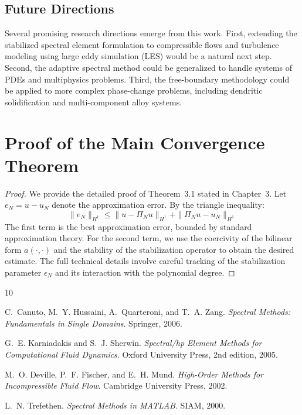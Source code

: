 \documentclass[12pt,a4paper,oneside]{report}
\begin{document}
\section{Future Directions}

Several promising research directions emerge from this work. First, extending the stabilized spectral element formulation to compressible flows and turbulence modeling using large eddy simulation (LES) would be a natural next step. Second, the adaptive spectral method could be generalized to handle systems of PDEs and multiphysics problems. Third, the free-boundary methodology could be applied to more complex phase-change problems, including dendritic solidification and multi-component alloy systems.

\appendix

\chapter{Proof of the Main Convergence Theorem}
\label{app:proof}

\begin{proof}
We provide the detailed proof of Theorem~3.1 stated in Chapter~3. Let $e_N = u - u_N$ denote the approximation error. By the triangle inequality:
\begin{equation}
  \|e_N\|_{H^1} \leq \|u - \Pi_N u\|_{H^1} + \|\Pi_N u - u_N\|_{H^1}
\end{equation}
The first term is the best approximation error, bounded by standard approximation theory. For the second term, we use the coercivity of the bilinear form $a(\cdot,\cdot)$ and the stability of the stabilization operator to obtain the desired estimate. The full technical details involve careful tracking of the stabilization parameter $\epsilon_N$ and its interaction with the polynomial degree.
\end{proof}


% 

\begin{thebibliography}{10}

C.~Canuto, M.~Y. Hussaini, A.~Quarteroni, and T.~A. Zang.
\newblock \textit{Spectral Methods: Fundamentals in Single Domains}.
\newblock Springer, 2006.

G.~E. Karniadakis and S.~J. Sherwin.
\newblock \textit{Spectral/hp Element Methods for Computational Fluid Dynamics}.
\newblock Oxford University Press, 2nd edition, 2005.

M.~O. Deville, P.~F. Fischer, and E.~H. Mund.
\newblock \textit{High-Order Methods for Incompressible Fluid Flow}.
\newblock Cambridge University Press, 2002.

L.~N. Trefethen.
\newblock \textit{Spectral Methods in MATLAB}.
\newblock SIAM, 2000.

\end{thebibliography}
\end{document}
